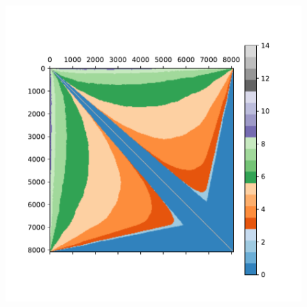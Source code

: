 \documentclass[aps, pre, twocolumn, nofootinbib]{revtex4-1}
\begin{document}
\begin{figure}[htbp]
	\includegraphics[scale = 0.33]{plots/d_m_2013}
	

\end{figure}
\end{document}
